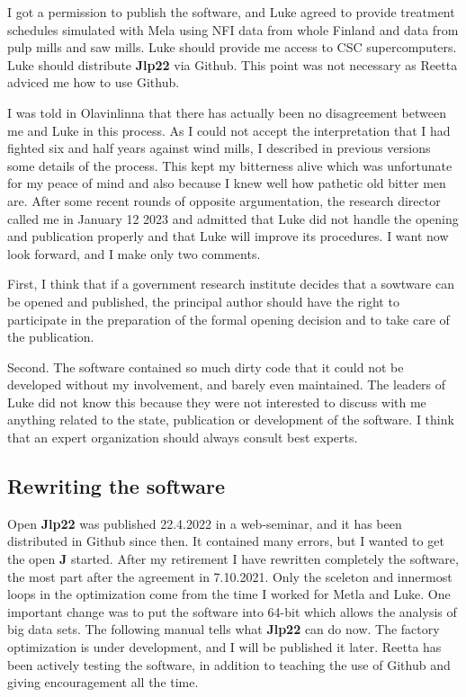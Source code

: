 I got a 
permission to publish the software, and Luke agreed to 
provide  treatment schedules simulated with Mela using NFI data from whole Finland and data 
from pulp mills and saw mills. 
Luke should provide me access to CSC supercomputers.  Luke should distribute \textbf{Jlp22} via Github.  This point 
was not necessary as Reetta adviced me how to use Github. 
 
I was told in Olavinlinna that there has actually been no disagreement 
between me and Luke in this process. 
As I could not accept the interpretation that I had fighted six and half years against wind mills, 
I described in previous versions some details of the process. This kept my bitterness 
alive which was unfortunate for my peace of mind and also because 
I knew well how pathetic old bitter men are. After some recent rounds of opposite argumentation, the research director 
called me in January 12 2023 and admitted that Luke did not handle the opening and publication properly 
and that Luke will improve its procedures. I want now look forward, and I make 
only two comments. 
 
First, I think that if a government research institute decides that a sowtware can be 
opened and published, the principal author should have the right to participate in the 
preparation of the formal opening decision and to take care of the publication. 
 
Second. 
The software contained so much dirty code that it could not be developed without my involvement, 
and barely even maintained. The leaders of Luke did not know this because they were not 
interested to discuss with me anything related to the state, publication or 
development of the software. I think that an expert organization should 
always consult best experts. 
 
 
\subsection*{Rewriting the software} 
 
Open \textbf{Jlp22} was published 22.4.2022 in a web-seminar, and it has been distributed in Github since then. 
It contained many errors, but I wanted to get the open \textbf{J} started. 
After my retirement I have rewritten completely the software, 
the most part after the agreement in 7.10.2021. 
Only the sceleton and innermost loops in the optimization come from the time I worked 
for Metla and Luke. One important change was to put the software into 64-bit which 
allows the analysis of big data sets. The following manual tells what \textbf{Jlp22} can do now. 
The factory optimization is under development, and I will be published it later. 
Reetta has been actively testing the software, 
in addition to teaching the use of Github and giving encouragement all the time. 
 
